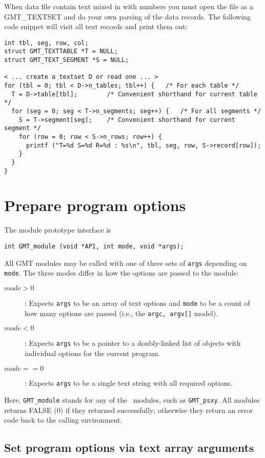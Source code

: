 \documentclass[11pt]{report}
\begin{document}
When data file contain text mixed in with numbers you must open the
file as a GMT\_TEXTSET and do your own parsing of the data records.
The following code snippet will visit all text records and print
them out:

\begin{verbatim}
int tbl, seg, row, col;
struct GMT_TEXTTABLE *T = NULL;
struct GMT_TEXT_SEGMENT *S = NULL;

< ... create a textset D or read one ... >
for (tbl = 0; tbl < D->n_tables; tbl++) {	/* For each table */
  T = D->table[tbl];        /* Convenient shorthand for current table */
  for (seg = 0; seg < T->n_segments; seg++) {	/* For all segments */
    S = T->segment[seg];    /* Convenient shorthand for current segment */
    for (row = 0; row < S->n_rows; row++) {
      printf ("T=%d S=%d R=%d : %s\n", tbl, seg, row, S->record[row]);
    }
  }
}
\end{verbatim}

\section{Prepare program options}
\label{sec:func}
The module prototype interface is

\begin{verbatim}
int GMT_module (void *API, int mode, void *args);
\end{verbatim}
All GMT modules may be called with one of three sets of \texttt{args} depending on \texttt{mode}.
The three modes differ in how the options are passed to the module:
\begin{description}
\item [$mode > 0$]: Expects \texttt{args} to be an array of text options and \texttt{mode} to be a count of
how many options are passed (i.e., the \texttt{argc, argv[]} model).
\item [$mode < 0$]: Expects \texttt{args} to be a pointer to a doubly-linked list of objects with individual options
for the current program.
\item [$mode == 0$]: Expects \texttt{args} to be a single text string with all required options.
\end{description}
Here, \texttt{GMT\_module} stands for any of the \GMT\ modules, such as \texttt{GMT\_psxy}.
All modules returns FALSE (0) if they returned successfully; otherwise they return an error code
back to the calling environment.

\subsection{Set program options via text array arguments}
\end{document}
